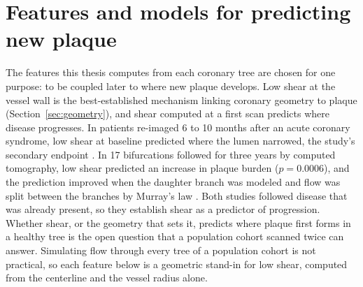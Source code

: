 %
%

\section{Features and models for predicting new plaque}
\label{sec:risk-features}

The features this thesis computes from each coronary tree are chosen for one purpose: to be coupled later to where new plaque develops.
Low shear at the vessel wall is the best-established mechanism linking coronary geometry to plaque (Section~\ref{sec:geometry}), and shear computed at a first scan predicts where disease progresses.
In patients re-imaged 6 to 10 months after an acute coronary syndrome, low shear at baseline predicted where the lumen narrowed, the study's secondary endpoint \cite{stone2012prediction}.
In 17 bifurcations followed for three years by computed tomography, low shear predicted an increase in plaque burden ($p = 0.0006$), and the prediction improved when the daughter branch was modeled and flow was split between the branches by Murray's law \cite{sakellarios2017bifurcation}.
Both studies followed disease that was already present, so they establish shear as a predictor of progression.
Whether shear, or the geometry that sets it, predicts where plaque first forms in a healthy tree is the open question that a population cohort scanned twice can answer.
Simulating flow through every tree of a population cohort is not practical, so each feature below is a geometric stand-in for low shear, computed from the centerline and the vessel radius alone.

